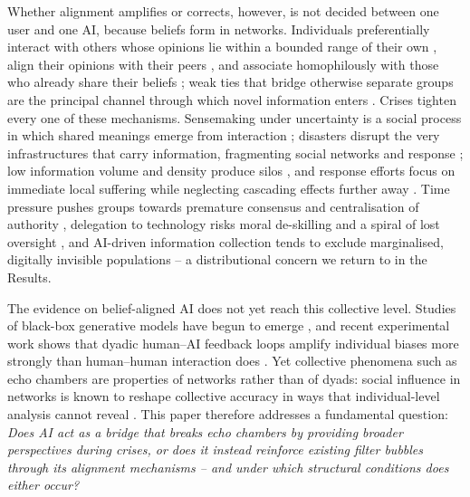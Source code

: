 \documentclass[pdflatex,sn-nature]{sn-jnl}
\begin{document}
Whether alignment amplifies or corrects, however, is not decided between one user and one AI, because beliefs form in networks. Individuals preferentially interact with others whose opinions lie within a bounded range of their own \citep{hegselmann2002opinion}, align their opinions with their peers \citep{friedkin1999social}, and associate homophilously with those who already share their beliefs \citep{mcpherson2001birds}; weak ties that bridge otherwise separate groups are the principal channel through which novel information enters \citep{granovetter1973strength}. Crises tighten every one of these mechanisms. Sensemaking under uncertainty is a social process in which shared meanings emerge from interaction \citep{weick2005organizing,maitlis2010sensemaking,klein2010rapid}; disasters disrupt the very infrastructures that carry information, fragmenting social networks and response \citep{holguin2012unique}; low information volume and density produce silos \citep{pan2012crisis}, and response efforts focus on immediate local suffering while neglecting cascading effects further away \citep{sigala2022mitigating,wolbers2018introducing}. Time pressure pushes groups towards premature consensus and centralisation of authority \citep{driskell1991group}, delegation to technology risks moral de-skilling and a spiral of lost oversight \citep{vallor2015moral,comes2024ai}, and AI-driven information collection tends to exclude marginalised, digitally invisible populations \citep{coleman2024weaving} -- a distributional concern we return to in the Results.

The evidence on belief-aligned AI does not yet reach this collective level. Studies of black-box generative models have begun to emerge \citep{sharma2024generative,zhang2024see}, and recent experimental work shows that dyadic human--AI feedback loops amplify individual biases more strongly than human--human interaction does \citep{glickman2024human}. Yet collective phenomena such as echo chambers are properties of networks rather than of dyads: social influence in networks is known to reshape collective accuracy in ways that individual-level analysis cannot reveal \citep{lorenz2011social,becker2017network}. This paper therefore addresses a fundamental question: \emph{Does AI act as a bridge that breaks echo chambers by providing broader perspectives during crises, or does it instead reinforce existing filter bubbles through its alignment mechanisms -- and under which structural conditions does either occur?}
\end{document}
